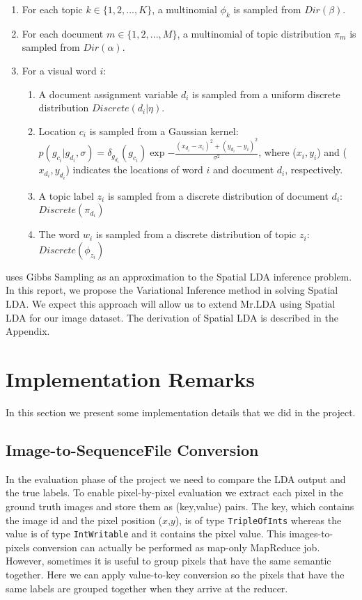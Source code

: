 \documentclass{acm_proc_article-sp}
\begin{document}
\begin{enumerate}
\item For each topic $k \in \{1,2,...,K\}$, a multinomial $\phi_k$ is sampled from $Dir(\beta)$.
\item For each document $m \in \{1,2,...,M\}$, a multinomial of topic distribution $\pi_m$ is sampled from $Dir(\alpha)$.
\item For a visual word $i$:
	\begin{enumerate}
		\item A document assignment variable $d_i$ is sampled from a uniform discrete distribution $Discrete(d_i|\eta)$.
		\item Location $c_i$ is sampled from a Gaussian kernel: $p(g_{c_i} | g_{d_i}, \sigma) = \delta_{g_{d_i}}(g_{c_i}) \exp{-\frac{(x_{d_i} - x_i)^2 + (y_{d_i} - y_i)^2} {\sigma^2}}$, where ($x_i, y_i$) and ($x_{d_i}, y_{d_i}$) indicates the locations of word $i$ and document $d_i$, respectively.
		\item A topic label $z_{i}$ is sampled from a discrete distribution of document $d_i$:  $Discrete(\pi_{d_i})$
		\item The word $w_i$ is sampled from a discrete distribution of topic $z_{i}$: $Discrete(\phi_{z_i})$ 
	\end{enumerate}
\end{enumerate}

\cite{DBLP:conf/nips/WangG07} uses Gibbs Sampling as an approximation to the Spatial LDA inference problem. In this report, we propose the Variational Inference method in solving Spatial LDA. We expect this approach will allow us to extend Mr.LDA using Spatial LDA for our image dataset. The derivation of Spatial LDA is described in the Appendix.

\section{Implementation Remarks}\label{sec:impl}
In this section we present some implementation details that we did in the project.
\subsection{Image-to-SequenceFile Conversion}
In the evaluation phase of the project we need to compare the LDA output and the true labels. To enable pixel-by-pixel evaluation we extract each pixel in the ground truth images and store them as (key,value) pairs. The key, which contains the image id and the pixel position ($x$,$y$), is of type \texttt{TripleOfInts} whereas the value is of type \texttt{IntWritable} and it contains the pixel value. This images-to-pixels conversion can actually be performed as map-only MapReduce job. However, sometimes it is useful to group pixels that have the same semantic together. Here we can apply value-to-key conversion so the pixels that have the same labels are grouped together when they arrive at the reducer.
\end{document}
